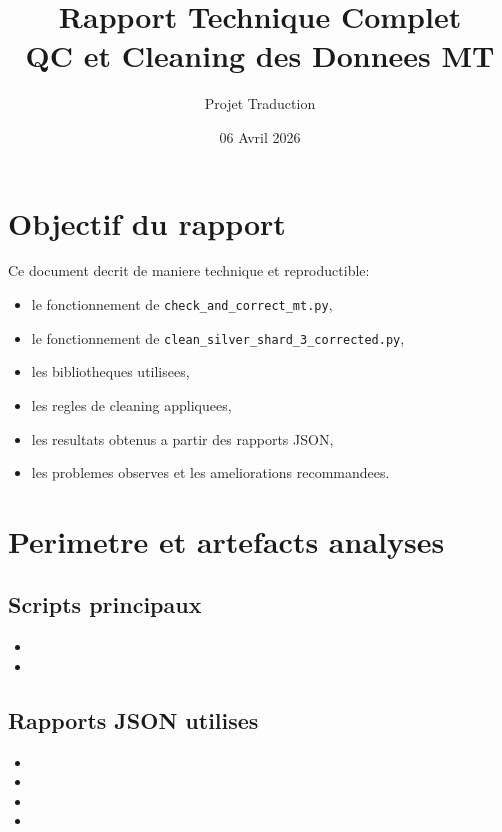 \documentclass[11pt,a4paper]{article}
\title{Rapport Technique Complet\\
QC et Cleaning des Donnees MT}
\author{Projet Traduction}
\date{06 Avril 2026}
\begin{document}
\maketitle
\tableofcontents
\newpage

\section{Objectif du rapport}
Ce document decrit de maniere technique et reproductible:
\begin{itemize}[leftmargin=*]
  \item le fonctionnement de \texttt{check\_and\_correct\_mt.py},
  \item le fonctionnement de \texttt{clean\_silver\_shard\_3\_corrected.py},
  \item les bibliotheques utilisees,
  \item les regles de cleaning appliquees,
  \item les resultats obtenus a partir des rapports JSON,
  \item les problemes observes et les ameliorations recommandees.
\end{itemize}

\section{Perimetre et artefacts analyses}
\subsection{Scripts principaux}
\begin{itemize}[leftmargin=*]
  \item {}
  \item {}
\end{itemize}

\subsection{Rapports JSON utilises}
\begin{itemize}[leftmargin=*]
  \item {}
  \item {}
  \item {}
  \item {}
\end{itemize}
\end{document}
